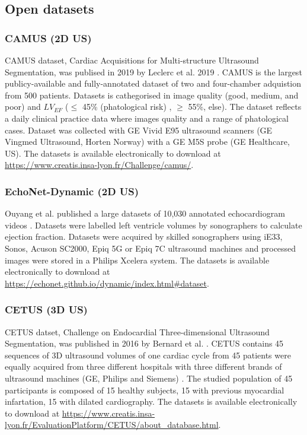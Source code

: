 \subsection{Open datasets}
\subsubsection{CAMUS (2D US)}
CAMUS dataset, Cardiac Acquisitions for Multi-structure Ultrasound Segmentation, was publised in 2019 by Leclerc et al. 2019 \cite{leclerc2019-IEEETransMedicalImaging}.
CAMUS is the largest publicy-available and fully-annotated dataset of two and four-chamber adquistion from 500 patients.
Datasets is cathegorised in image quality (good, medium, and poor) and $LV_{EF}$ ($\leq$ 45\% (phatological risk) , $\geq$ 55\%, else).
The dataset reflects a daily clinical practice data where images quality and a range of phatological cases.
Dataset was collected with GE Vivid E95 ultrasound scanners (GE Vingmed Ultrasound, Horten Norway) with a GE M5S probe (GE Healthcare, US).
The datasets is available electronically to download at \url{https://www.creatis.insa-lyon.fr/Challenge/camus/}.

\subsubsection{EchoNet-Dynamic (2D US)}
Ouyang et al. published a large datasets of 10,030 annotated echocardiogram videos \cite{ouyang-NeuripsML4H2019, Ouyang-Nature-APR2020}.
Datasets were labelled left ventricle volumes by sonographers to calculate ejection fraction.
Datasets were acquired by skilled sonographers using iE33, Sonos, Acuson SC2000, Epiq 5G or Epiq 7C ultrasound machines and processed images were stored in a Philips Xcelera system.
The datasets is available electronically to download at \url{https://echonet.github.io/dynamic/index.html#dataset}.

\subsubsection{CETUS (3D US)}
CETUS datset, Challenge on Endocardial Three-dimensional Ultrasound Segmentation, was published in 2016 by Bernard et al. \cite{bernard2016TMI}.
CETUS contains 45 sequences of 3D ultrasound volumes of one cardiac cycle from 45 patients were equally acquired from three different hospitals with three different brands of ultrasound machines (GE, Philips and Siemens) \cite{bernard2016TMI}.
The studied population of 45 participants is composed of 15 healthy subjects, 15 with previous myocardial infartation, 15 with dilated cardiography.
The datasets is available electronically to download at \url{https://www.creatis.insa-lyon.fr/EvaluationPlatform/CETUS/about_database.html}.

